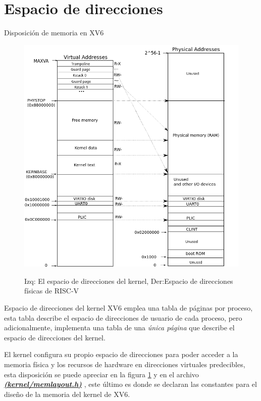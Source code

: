 \documentclass{libs/ufc_format}
\begin{document}
\section{Espacio de direcciones}
\begin{frame}{Disposición de memoria en XV6}
    \begin{figure}
        \centering
        \caption{Izq: El espacio de direcciones del kernel, Der:Espacio de direcciones físicas de RISC-V \cite{xv6_book}}
        \includegraphics[scale=0.2]{libs/img/xv6_layout.png}
        \label{fig:esquema_dir_kernel}
    \end{figure}
\end{frame}
\begin{frame}{Espacio de direcciones del kernel}
    XV6 emplea una tabla de páginas por proceso, esta tabla describe el espacio de direcciones de usuario de cada proceso, pero adicionalmente, implementa una tabla de una \emph{única página} que describe el espacio de direcciones del kernel.
    
    \vspace{0.3cm}
    
    El kernel configura su propio espacio de direcciones para poder acceder a la memoria física y los recursos de hardware en direcciones virtuales predecibles, esta disposición se puede apreciar en la figura \ref{fig:esquema_dir_kernel} y en el archivo \href{https://github.com/CarlosSandoval-03/xv6-riscv/blob/riscv/kernel/memlayout.h}{\textbf{\textit{(kernel/memlayout.h)}}} \cite{xv6}, este último es donde se declaran las constantes para el diseño de la memoria del kernel de XV6. \cite{xv6_book}
\end{frame}
\end{document}
